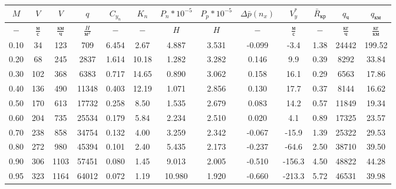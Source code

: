 \begin{tabular}{|c|c|c|c|c|c|c|c|c|c|c|c|c|}
\hline
$M$ & $V$ & $V$ & $q$ & $C_{y_n}$ & $K_n$ & $P_n*10^{-5}$ & $P_p*10^{-5}$ & $\Delta \bar{p}(n_x)$ & $V_y^*$ & $\bar{R}_{кр}$ & $q_{ч}$ & $q_{км}$ \\ 
\hline
$-$ & $\frac{м}{с}$ & $\frac{км}{ч}$ & $\frac{H}{м^2}$ & $-$ & $-$ & $H$ & $H$ & $-$ & $\frac{м}{с}$ & $-$ & $\frac{кг}{ч}$ & $\frac{кг}{км}$ \\ 
\hline
0.10 & 34 & 123 & 709 & 6.454 & 2.67 & 4.887 & 3.531 & -0.099 & -3.4 & 1.38 & 24442 & 199.52 \\ 
\hline
0.20 & 68 & 245 & 2837 & 1.614 & 10.18 & 1.282 & 3.282 & 0.146 & 9.9 & 0.39 & 8292 & 33.84 \\ 
\hline
0.30 & 102 & 368 & 6383 & 0.717 & 14.65 & 0.890 & 3.062 & 0.158 & 16.1 & 0.29 & 6563 & 17.86 \\ 
\hline
0.40 & 136 & 490 & 11348 & 0.403 & 12.19 & 1.071 & 2.856 & 0.130 & 17.7 & 0.37 & 8144 & 16.62 \\ 
\hline
0.50 & 170 & 613 & 17732 & 0.258 & 8.50 & 1.535 & 2.679 & 0.083 & 14.2 & 0.57 & 11849 & 19.34 \\ 
\hline
0.60 & 204 & 735 & 25534 & 0.179 & 5.84 & 2.234 & 2.510 & 0.020 & 4.1 & 0.89 & 17325 & 23.57 \\ 
\hline
0.70 & 238 & 858 & 34754 & 0.132 & 4.00 & 3.259 & 2.342 & -0.067 & -15.9 & 1.39 & 25322 & 29.53 \\ 
\hline
0.80 & 272 & 980 & 45394 & 0.101 & 2.40 & 5.435 & 2.173 & -0.237 & -64.6 & 2.50 & 38710 & 39.50 \\ 
\hline
0.90 & 306 & 1103 & 57451 & 0.080 & 1.45 & 9.013 & 2.005 & -0.510 & -156.3 & 4.50 & 48822 & 44.28 \\ 
\hline
0.95 & 323 & 1164 & 64012 & 0.072 & 1.19 & 10.980 & 1.920 & -0.660 & -213.3 & 5.72 & 46531 & 39.98 \\ 
\hline
\end{tabular}